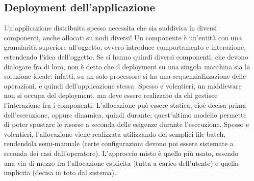 \subsection{Deployment dell'applicazione}
Un'applicazione distribuita spesso necessita che sia suddivisa in diversi componenti, anche allocati su nodi diversi!
Un componente è un'entità con una granularità superiore all'oggetto, ovvero introduce comportamento e interazione,
estendendo l'idea dell'oggetto.
Se si hanno quindi diversi componenti, che devono dialogare fra di loro, non è detto che il deployment su una singola
macchina sia la soluzione ideale: infatti, su un solo processore si ha una sequenzializzazione delle operazioni, e
quindi dell'applicazione stessa.
Spesso e volentieri, un middleware non si occupa del deployment, ma deve essere realizzato da chi gestisce l'interazione
fra i componenti. L'allocazione può essere statica, cioè decisa prima dell'esecuzione, oppure dinamica, quindi
durante; quest'ultimo modello permette di poter spostare le risorse a seconda delle esigenze durante l'esecuzione.
Spesso e volentieri, l'allocazione viene realizzata utilizzando dei semplici file batch, rendendola semi-manuale (certe
configurazioni devono poi essere sistemate a seconda dei casi dall'operatore).
L'approccio misto è quello più usato, essendo una via di mezzo fra l'allocazione esplicita (tutta a carico dell'utente)
e quella implicita (decisa in toto dal sistema).

